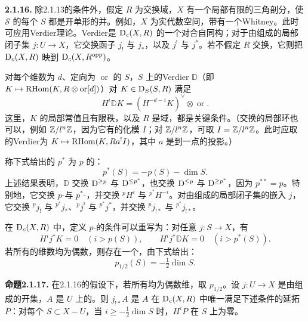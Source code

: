 \par\medskip\noindent\textbf{2.1.16.} 除2.1.13的条件外，假定 $R$ 为交换域，$X$ 有一个局部有限的三角剖分，使 $\mathcal S$ 的每个 $S$ 都是开单形的并。例如，$X$ 为实代数空间，带有一个Whitney。此时可应用Verdier理论。Verdier是 $\mathrm{D}_c(X,R)$ 的一个对合自同构；对于由组成的局部闭子集 $j\colon U\to X$，它交换函子 $j_!$ 与 $j_*$，以及 $j^!$ 与 $j^*$。若不假定 $R$ 交换，它则把 $\mathrm{D}_c(X,R)$ 映到 $\mathrm{D}_c(X,R^{\mathrm{opp}})$。

对每个维数为 $d$、定向为 $\operatorname{or}$ 的 $S$，$S$ 上的Verdier $\mathbb D$（即 $K\mapsto\operatorname{RHom}(K,R\otimes\operatorname{or}[d])$）对 $K\in\mathrm{D}_S(S,R)$ 满足
\[
 H^i\mathbb DK=(H^{-d-i}K)^\vee\otimes\operatorname{or}.
\]
这里，$K$ 的局部常值且有限秩，以及 $R$ 是域，都是关键条件。（交换的局部环也可以，例如 $\mathbb Z/l^n\mathbb Z$，因为它有的化模 $I$；对 $\mathbb Z/l^n\mathbb Z$，可取 $I=\mathbb Z/l^n\mathbb Z$。此时应取的Verdier为 $K\mapsto\operatorname{RHom}(K,Ra^!I)$，其中 $a$ 是到一点的投影。）

称下式给出的 $p^*$ 为 $p$ 的\emph{}：
\[
 p^*(S)=-p(S)-\dim S.
\]
上述结果表明，$\mathbb D$ 交换 $\mathrm{D}^{\geq p}$ 与 $\mathrm{D}^{\leq p^*}$，也交换 $\mathrm{D}^{\leq p}$ 与 $\mathrm{D}^{\geq p^*}$，因为 $p^{**}=p$。特别地，它交换 $p$-与 $p^*$-，并交换 ${}^pH^i$ 与 ${}^{p^*}H^{-i}$。对由组成的局部闭子集的嵌入 $j$，它交换 ${}^pj_!$ 与 ${}^{p^*}j_*$、${}^pj^!$ 与 ${}^{p^*}j^*$，并交换 ${}^pj_{!*}$ 与 ${}^{p^*}j_{!*}$。

在 $\mathrm{D}_c(X,R)$ 中，定义 $p$-的条件可以重写为：对任意 $j\colon S\to X$，有
\[
 H^ij^*K=0\quad(i>p(S)),\qquad
 H^ij^*\mathbb DK=0\quad(i>p^*(S)).
\]
若所有的维数均为偶数，则存在一个，由下式给出：
\[
 p_{1/2}(S)=-\tfrac12\dim S.
\]

\par\medskip\noindent\textbf{命题2.1.17.} 在2.1.16的假设下，若所有均为偶数维，取 $p_{1/2}$。设 $j\colon U\to X$ 是由组成的开集，$A$ 是 $U$ 上的。则 $j_{!*}A$ 是 $A$ 在 $\mathrm{D}_c(X,R)$ 中唯一满足下述条件的延拓 $P$：对每个 $S\subset X-U$，当 $i\geq-\frac12\dim S$ 时，$H^iP$ 在 $S$ 上为零。

